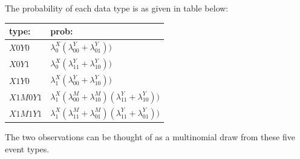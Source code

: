 \documentclass[
  12pt,
]{book}
\begin{document}
The probability of each data type is as given in table below:

\begin{longtable}[]{@{}ll@{}}
\toprule
\begin{minipage}[b]{0.24\columnwidth}\raggedright
type:\strut
\end{minipage} & \begin{minipage}[b]{0.70\columnwidth}\raggedright
prob:\strut
\end{minipage}\tabularnewline
\midrule
\endhead
\begin{minipage}[t]{0.24\columnwidth}\raggedright
\(X0Y0\)\strut
\end{minipage} & \begin{minipage}[t]{0.70\columnwidth}\raggedright
\(\lambda^X_0(\lambda^Y_{00}+\lambda^Y_{01}))\)\strut
\end{minipage}\tabularnewline
\begin{minipage}[t]{0.24\columnwidth}\raggedright
\(X0Y1\)\strut
\end{minipage} & \begin{minipage}[t]{0.70\columnwidth}\raggedright
\(\lambda^X_0(\lambda^Y_{11}+\lambda^Y_{10}))\)\strut
\end{minipage}\tabularnewline
\begin{minipage}[t]{0.24\columnwidth}\raggedright
\(X1Y0\)\strut
\end{minipage} & \begin{minipage}[t]{0.70\columnwidth}\raggedright
\(\lambda^X_1(\lambda^Y_{00}+\lambda^Y_{10}))\)\strut
\end{minipage}\tabularnewline
\begin{minipage}[t]{0.24\columnwidth}\raggedright
\(X1M0Y1\)\strut
\end{minipage} & \begin{minipage}[t]{0.70\columnwidth}\raggedright
\(\lambda^X_1(\lambda^M_{00}+\lambda^M_{10})(\lambda^Y_{11}+\lambda^Y_{10}))\)\strut
\end{minipage}\tabularnewline
\begin{minipage}[t]{0.24\columnwidth}\raggedright
\(X1M1Y1\)\strut
\end{minipage} & \begin{minipage}[t]{0.70\columnwidth}\raggedright
\(\lambda^X_1(\lambda^M_{11}+\lambda^M_{01})(\lambda^Y_{11}+\lambda^Y_{01}))\)\strut
\end{minipage}\tabularnewline
\bottomrule
\end{longtable}

The two observations can be thought of as a multinomial draw from these five event types.
\end{document}
